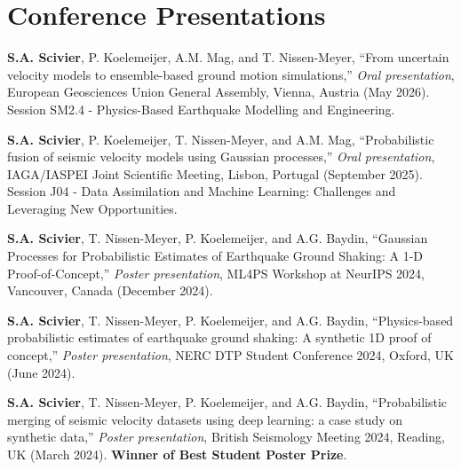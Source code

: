 \documentclass[11pt,a4paper]{article}
\begin{document}
\section*{Conference Presentations}
\renewcommand{\labelenumi}{[\arabic{enumi}]}
\begin{etaremune}[itemsep=4pt, start=5]

\item \textbf{S.A. Scivier}, P. Koelemeijer, A.M. Mag, and T. Nissen-Meyer, ``From uncertain velocity models to ensemble-based ground motion simulations,'' \textit{Oral presentation}, European Geosciences Union General Assembly, Vienna, Austria (May 2026). Session SM2.4 - Physics-Based Earthquake Modelling and Engineering.

\item \textbf{S.A. Scivier}, P. Koelemeijer, T. Nissen-Meyer, and A.M. Mag, ``Probabilistic fusion of seismic velocity models using Gaussian processes,'' \textit{Oral presentation}, IAGA/IASPEI Joint Scientific Meeting, Lisbon, Portugal (September 2025). Session J04 - Data Assimilation and Machine Learning: Challenges and Leveraging New Opportunities.

\item \textbf{S.A. Scivier}, T. Nissen-Meyer, P. Koelemeijer, and A.G. Baydin, ``Gaussian Processes for Probabilistic Estimates of Earthquake Ground Shaking: A 1-D Proof-of-Concept,'' \textit{Poster presentation}, ML4PS Workshop at NeurIPS 2024, Vancouver, Canada (December 2024).

\item \textbf{S.A. Scivier}, T. Nissen-Meyer, P. Koelemeijer, and A.G. Baydin, ``Physics-based probabilistic estimates of earthquake ground shaking: A synthetic 1D proof of concept,'' \textit{Poster presentation}, NERC DTP Student Conference 2024, Oxford, UK (June 2024).

\item \textbf{S.A. Scivier}, T. Nissen-Meyer, P. Koelemeijer, and A.G. Baydin, ``Probabilistic merging of seismic velocity datasets using deep learning: a case study on synthetic data,'' \textit{Poster presentation}, British Seismology Meeting 2024, Reading, UK (March 2024). \textbf{Winner of Best Student Poster Prize}.

\end{etaremune}
\end{document}

